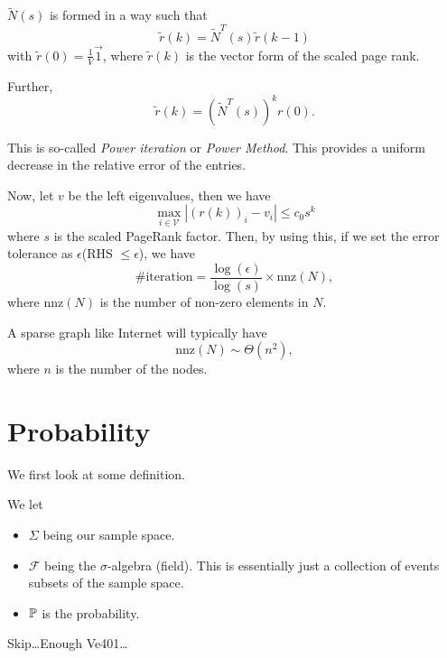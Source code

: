 \begin{answer}
	\(\widetilde{N}(s)\) is formed in a way such that
	\[
		\widetilde{r}(k) = \widetilde{N}^{T}(s)\widetilde{r}(k - 1)
	\]
	with \(\widetilde{r}(0) = \frac{1}{V}\vec{1}\), where \(\widetilde{r}(k)\) is the vector form of the scaled page rank.

	Further,
	\[
		\widetilde{r}(k) = \left(\widetilde{N}^{T}(s)\right)^k r(0).
	\]

	This is so-called \emph{Power iteration} or \emph{Power Method}. This provides a uniform decrease in the relative error of the entries.

	Now, let \(v\) be the left eigenvalues, then we have
	\[
		\max_{i\in \mathcal{V}}\left\vert (r(k))_i - v_i\right\vert \leq c_0 s^k
	\]
	where \(s\) is the scaled PageRank factor. Then, by using this, if we set the error tolerance as \(\epsilon\)(RHS \(\leq \epsilon\)), we have
	\[
		\#\text{iteration} = \frac{\log(\epsilon)}{\log(s)}\times \mathrm{nnz}(N),
	\]
	where \(\mathrm{nnz}(N)\) is the number of non-zero elements in \(N\).
	\begin{remark}
		A sparse graph like Internet will typically have
		\[
			\mathrm{nnz}(N)\sim\Theta(n^2),
		\]
		where \(n\) is the number of the nodes.
	\end{remark}
\end{answer}


\section{Probability}
We first look at some definition.
\begin{definition}
	We let
	\begin{itemize}
		\item \(\Sigma\) being our sample space.
		\item \(\mathcal{F}\) being the \(\sigma\)-algebra (field). This is essentially just a collection of events subsets of the sample space.
		\item \(\mathbb{\MakeUppercase{P}}\) is the probability.
	\end{itemize}
\end{definition}

\begin{eg}
	Skip\ldots Enough Ve401\ldots
\end{eg}

